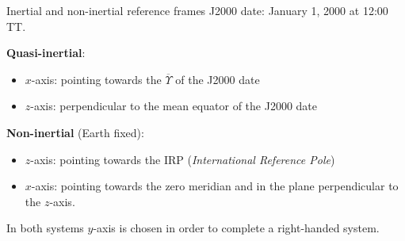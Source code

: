 \documentclass{beamer} %
\begin{document}
\begin{frame}{Inertial and non-inertial reference frames}
  J2000 date: January 1, 2000 at 12:00 TT.
  \vspace{0.5cm}

  \textbf{Quasi-inertial}:
  \begin{itemize}
    \item $x$-axis: pointing towards the $\overline{\Upsilon}$ of the J2000 date
    \item $z$-axis: perpendicular to the mean equator of the J2000 date
  \end{itemize}

  \textbf{Non-inertial} (Earth fixed):
  \begin{itemize}
    \item $z$-axis: pointing towards the IRP (\emph{International Reference Pole})
    \item $x$-axis: pointing towards the zero meridian and in the plane perpendicular to the $z$-axis.
  \end{itemize}

  In both systems $y$-axis is chosen in order to complete a right-handed system.
\end{frame}
\end{document}
